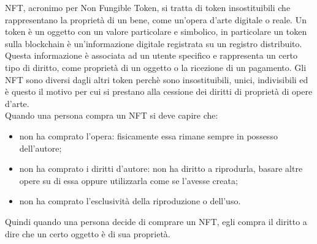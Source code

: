 \gls{NFT}, acronimo per Non Fungible Token, si tratta di token insostituibili che rappresentano la proprietà di un bene, come un'opera d'arte digitale o reale. Un token è un oggetto con un valore particolare e simbolico, in particolare un token sulla blockchain è un'informazione digitale registrata su un registro distribuito. Questa informazione è associata ad un utente specifico e rappresenta un certo tipo di diritto, come proprietà di un oggetto o la ricezione di un pagamento. Gli \gls{NFT} sono diversi dagli altri token perchè sono insostituibili, unici, indivisibili ed è questo il motivo per cui si prestano alla cessione dei diritti di proprietà di opere d'arte.\\
Quando una persona compra un \gls{NFT} si deve capire che:
\begin{itemize}
	\item non ha comprato l'opera: fisicamente essa rimane sempre in possesso dell'autore;
	\item non ha comprato i diritti d'autore: non ha diritto a riprodurla, basare altre opere su di essa oppure utilizzarla come se l'avesse creata;
	\item non ha comprato l'esclusività della riproduzione o dell'uso.
\end{itemize}
Quindi quando una persona decide di comprare un \gls{NFT}, egli compra il diritto a dire che un certo oggetto è di sua proprietà.

